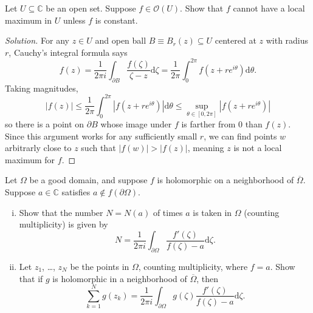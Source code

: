 \documentclass[10pt]{article}
\providecommand{\ol}{\overline}
\newcommand{\dd}{\mathrm{d}}
\providecommand{\CC}{\mathbb C}
\providecommand{\ii}{\item}
\newenvironment{soln}{\begin{proof}[Solution]}{\end{proof}}
\providecommand{\abs}[1]{\left\lvert #1\right\rvert}
\begin{document}
\begin{problem}
    Let $U\subseteq\CC$ be an open set.
    Suppose $f\in\mathcal O(U)$.
    Show that $f$ cannot have a local maximum in $U$
    unless $f$ is constant.
\end{problem}

\begin{soln}
    For any $z\in U$ and open ball $B\equiv B_r(z)\subseteq U$
    centered at $z$ with radius $r$, Cauchy's integral formula says
    \begin{equation*}
	f(z) = \frac 1{2\pi i}\int_{\partial B}
	\frac{f(\zeta)}{\zeta-z}\dd\zeta
	= \frac 1{2\pi}\int_0^{2\pi} f(z + re^{i\theta})\dd\theta.
    \end{equation*}
    Taking magnitudes,
    \begin{equation*}
	\abs{f(z)} \le \frac 1{2\pi}\int_0^{2\pi}
	\abs{f(z + re^{i\theta})}\dd\theta
	\le \sup_{\theta\in[0,2\pi]} \abs{f(z+re^{i\theta})}
    \end{equation*}
    so there is a point on $\partial B$ whose image under $f$
    is farther from $0$ than $f(z)$.
    Since this argument works for any sufficiently small $r$,
    we can find points $w$ arbitrarly close to $z$
    such that $\abs{f(w)} > \abs{f(z)}$,
    meaning $z$ is not a local maximum for $f$.
\end{soln}

\begin{problem}
    Let $\Omega$ be a good domain, and suppose $f$ is holomorphic
    on a neighborhood of $\ol\Omega$. Suppose $a\in\CC$ satisfies
    $a\notin f(\partial\Omega)$.
    \begin{enumerate}[(i)]
        \ii Show that the number $N = N(a)$ of times
	$a$ is taken in $\Omega$ (counting multiplicity) is given by
	\begin{equation*}
	    N = \frac 1{2\pi i}\int_{\partial\Omega}
	    \frac{f'(\zeta)}{f(\zeta)-a}\dd\zeta.
	\end{equation*}
	\ii Let $z_1$, \dots, $z_N$ be the points in $\Omega$,
	counting multiplicity, where $f=a$.
	Show that if $g$ is holomorphic in a neighborhood of $\ol\Omega$, then
	\begin{equation*}
	    \sum_{k=1}^N g(z_k) = \frac 1{2\pi i}\int_{\partial\Omega}
	    g(\zeta)\frac{f'(\zeta)}{f(\zeta)-a}\dd\zeta.
	\end{equation*}
    \end{enumerate}
\end{problem}
\end{document}
